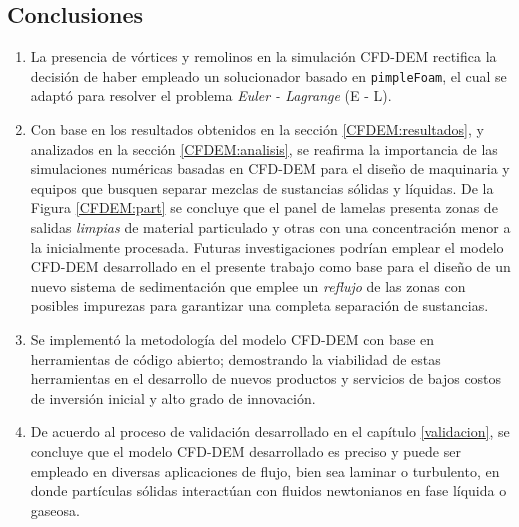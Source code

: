 \begin{center}
	\section{Conclusiones}
\end{center}


\begin{enumerate}
	\item La presencia de v\'ortices y remolinos en la simulaci\'on CFD-DEM rectifica la decisi\'on de haber empleado un solucionador basado en \texttt{pimpleFoam}, el cual se adapt\'o para resolver el problema \textit{Euler - Lagrange} (E - L).
	\item Con base en los resultados obtenidos en la secci\'on \ref{CFDEM:resultados}, y analizados en la secci\'on \ref{CFDEM:analisis}, se reafirma la importancia de las simulaciones num\'ericas basadas en CFD-DEM para el dise\~no de maquinaria y equipos que busquen separar mezclas de sustancias s\'olidas y l\'iquidas. De la Figura \ref{CFDEM:part} se concluye que el panel de lamelas presenta zonas de salidas \textit{limpias} de material particulado y otras con una concentraci\'on menor a la inicialmente procesada. Futuras investigaciones podr\'ian emplear el modelo CFD-DEM desarrollado en el presente trabajo como base para el dise\~no de un nuevo sistema de sedimentaci\'on que emplee un \textit{reflujo} de las zonas con posibles impurezas para garantizar una completa separaci\'on de sustancias.
	\item Se implement\'o la metodolog\'ia del modelo CFD-DEM con base en herramientas de c\'odigo abierto; demostrando la viabilidad de estas herramientas en el desarrollo de nuevos productos y servicios de bajos costos de inversi\'on inicial y alto grado de innovaci\'on.
	\item De acuerdo al proceso de validaci\'on desarrollado en el cap\'itulo \ref{validacion}, se concluye que el modelo CFD-DEM desarrollado es preciso y puede ser empleado en diversas aplicaciones de flujo, bien sea laminar o turbulento, en donde part\'iculas s\'olidas interact\'uan con fluidos newtonianos en fase l\'iquida o gaseosa.
\end{enumerate}
